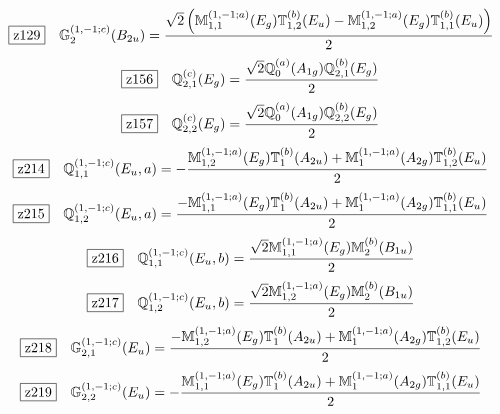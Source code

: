 \documentclass[fleqn,10pt,landscape]{jsarticle}
\begin{document}
\begin{dmath*}
\hspace*{3mm}\fbox{z129}\quad \mathbb{G}_{2}^{(1,-1;c)}(B_{2u})=\frac{\sqrt{2} \left(\mathbb{M}_{1,1}^{(1,-1;a)}(E_{g}) \mathbb{T}_{1,2}^{(b)}(E_{u}) - \mathbb{M}_{1,2}^{(1,-1;a)}(E_{g}) \mathbb{T}_{1,1}^{(b)}(E_{u})\right)}{2}
\end{dmath*}
\begin{dmath*}
\hspace*{3mm}\fbox{z156}\quad \mathbb{Q}_{2,1}^{(c)}(E_{g})=\frac{\sqrt{2} \mathbb{Q}_{0}^{(a)}(A_{1g}) \mathbb{Q}_{2,1}^{(b)}(E_{g})}{2}
\end{dmath*}
\begin{dmath*}
\hspace*{3mm}\fbox{z157}\quad \mathbb{Q}_{2,2}^{(c)}(E_{g})=\frac{\sqrt{2} \mathbb{Q}_{0}^{(a)}(A_{1g}) \mathbb{Q}_{2,2}^{(b)}(E_{g})}{2}
\end{dmath*}
\begin{dmath*}
\hspace*{3mm}\fbox{z214}\quad \mathbb{Q}_{1,1}^{(1,-1;c)}(E_{u},a)=- \frac{\mathbb{M}_{1,2}^{(1,-1;a)}(E_{g}) \mathbb{T}_{1}^{(b)}(A_{2u}) + \mathbb{M}_{1}^{(1,-1;a)}(A_{2g}) \mathbb{T}_{1,2}^{(b)}(E_{u})}{2}
\end{dmath*}
\begin{dmath*}
\hspace*{3mm}\fbox{z215}\quad \mathbb{Q}_{1,2}^{(1,-1;c)}(E_{u},a)=\frac{- \mathbb{M}_{1,1}^{(1,-1;a)}(E_{g}) \mathbb{T}_{1}^{(b)}(A_{2u}) + \mathbb{M}_{1}^{(1,-1;a)}(A_{2g}) \mathbb{T}_{1,1}^{(b)}(E_{u})}{2}
\end{dmath*}
\begin{dmath*}
\hspace*{3mm}\fbox{z216}\quad \mathbb{Q}_{1,1}^{(1,-1;c)}(E_{u},b)=\frac{\sqrt{2} \mathbb{M}_{1,1}^{(1,-1;a)}(E_{g}) \mathbb{M}_{2}^{(b)}(B_{1u})}{2}
\end{dmath*}
\begin{dmath*}
\hspace*{3mm}\fbox{z217}\quad \mathbb{Q}_{1,2}^{(1,-1;c)}(E_{u},b)=\frac{\sqrt{2} \mathbb{M}_{1,2}^{(1,-1;a)}(E_{g}) \mathbb{M}_{2}^{(b)}(B_{1u})}{2}
\end{dmath*}
\begin{dmath*}
\hspace*{3mm}\fbox{z218}\quad \mathbb{G}_{2,1}^{(1,-1;c)}(E_{u})=\frac{- \mathbb{M}_{1,2}^{(1,-1;a)}(E_{g}) \mathbb{T}_{1}^{(b)}(A_{2u}) + \mathbb{M}_{1}^{(1,-1;a)}(A_{2g}) \mathbb{T}_{1,2}^{(b)}(E_{u})}{2}
\end{dmath*}
\begin{dmath*}
\hspace*{3mm}\fbox{z219}\quad \mathbb{G}_{2,2}^{(1,-1;c)}(E_{u})=- \frac{\mathbb{M}_{1,1}^{(1,-1;a)}(E_{g}) \mathbb{T}_{1}^{(b)}(A_{2u}) + \mathbb{M}_{1}^{(1,-1;a)}(A_{2g}) \mathbb{T}_{1,1}^{(b)}(E_{u})}{2}
\end{dmath*}
\vspace{5mm}
\end{document}
